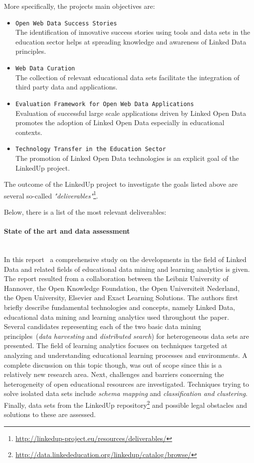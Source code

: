 \documentclass{article}
\begin{document}
More specifically, the projects main objectives are:
\begin{itemize}
	\item \texttt{Open Web Data Success Stories}~\\
	The identification of innovative success stories using tools and data sets in the education sector helps at spreading knowledge and awareness of Linked Data 
	principles. 
	\item \texttt{Web Data Curation}~\\
	The collection of relevant educational data sets facilitate the integration of third party data and applications. 
	\item \texttt{Evaluation Framework for Open Web Data Applications}~\\
	Evaluation of successful large scale applications driven by Linked Open Data promotes the adoption of Linked Open Data especially in educational contexts. 
	\item \texttt{Technology Transfer in the Education Sector}~\\
	The promotion of Linked Open Data technologies is an explicit goal of the LinkedUp project. 
\end{itemize}

The outcome of the LinkedUp project to investigate the goals listed above are several so-called \textit{"deliverables"}\footnote{\url{http://linkedup-project.eu/resources/deliverables/}}. 

Below, there is a list of the most relevant deliverables:
\paragraph{State of the art and data assessment}~\\
In this report~\cite{herder_state_2013} a comprehensive study on the developments in the field of Linked Data and
related fields of educational data mining and learning analytics is given. The report resulted from a collaboration between the Leibniz University of Hannover, the Open Knowledge Foundation, the Open Universiteit Nederland, the Open University, Elsevier and Exact Learning Solutions. The authors first briefly describe fundamental technologies and concepts, namely Linked Data, educational data mining and learning analytics used throughout the paper. Several candidates representing each of the two basic data mining principles~(\textit{data harvesting} and \textit{distributed search}) for heterogeneous data sets are presented. The field of learning analytics focuses on techniques targeted at analyzing and understanding educational learning processes and environments. A complete discussion on this topic though, was out of scope since this is a relatively new research area. Next, challenges and barriers concerning the heterogeneity of open educational resources are investigated. Techniques trying to solve isolated data sets include \textit{schema mapping} and \textit{classification and clustering}. Finally, data sets from the LinkedUp repository\footnote{\url{http://data.linkededucation.org/linkedup/catalog/browse/}} and possible legal obstacles and solutions to these are assessed. 
\end{document}
